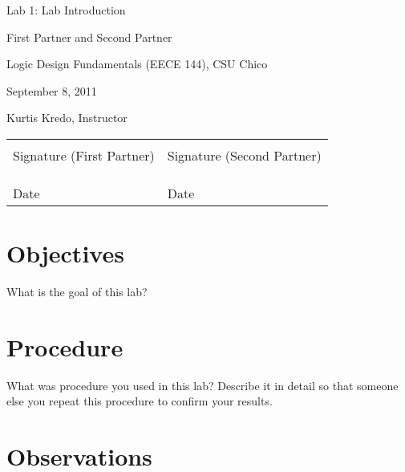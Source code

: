\documentclass[12pt]{article}
\begin{document}

\null
\thispagestyle{empty}  %
\vfill
\centerline{\LARGE Lab 1: Lab Introduction}
\vspace{0.3in}
\centerline{First Partner and Second Partner}
\centerline{Logic Design Fundamentals (EECE 144), CSU Chico}
\centerline{September 8, 2011}
\centerline{Kurtis Kredo, Instructor}
\vspace{5in}

\begin{center}
\begin{tabular}{l l}
\uline{\hspace{2.5in}} & \uline{\hspace{2.5in}} \\
Signature (First Partner) & Signature (Second Partner) \\
& \\
& \\
\uline{\hspace{2.5in}} & \uline{\hspace{2.5in}} \\
Date & Date \\
\end{tabular}
\end{center}

\vfill  %
\pagebreak

\thispagestyle{plain}  %

\tableofcontents

\pagebreak

\section{Objectives}

What is the goal of this lab?

\section{Procedure}

What was procedure you used in this lab?
Describe it in detail so that someone else you repeat
this procedure to confirm your results.

\section{Observations}
\end{document}
